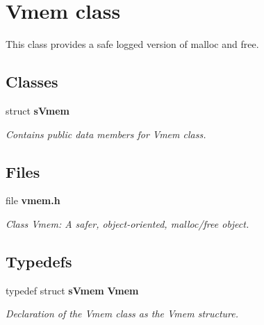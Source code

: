 \section{Vmem class}
\label{a00029}


This class provides a safe logged version of malloc and free.  


\subsection*{Classes}
\begin{DoxyCompactItemize}
\item 
struct {\bf sVmem}
\begin{DoxyCompactList}\small\item\em Contains public data members for Vmem class. \item\end{DoxyCompactList}\end{DoxyCompactItemize}
\subsection*{Files}
\begin{DoxyCompactItemize}
\item 
file {\bf vmem.h}


\begin{DoxyCompactList}\small\item\em Class Vmem: A safer, object-\/oriented, malloc/free object. \item\end{DoxyCompactList}

\end{DoxyCompactItemize}
\subsection*{Typedefs}
\begin{DoxyCompactItemize}
\item 
typedef struct {\bf sVmem} {\bf Vmem}
\begin{DoxyCompactList}\small\item\em Declaration of the Vmem class as the Vmem structure. \item\end{DoxyCompactList}\end{DoxyCompactItemize}
